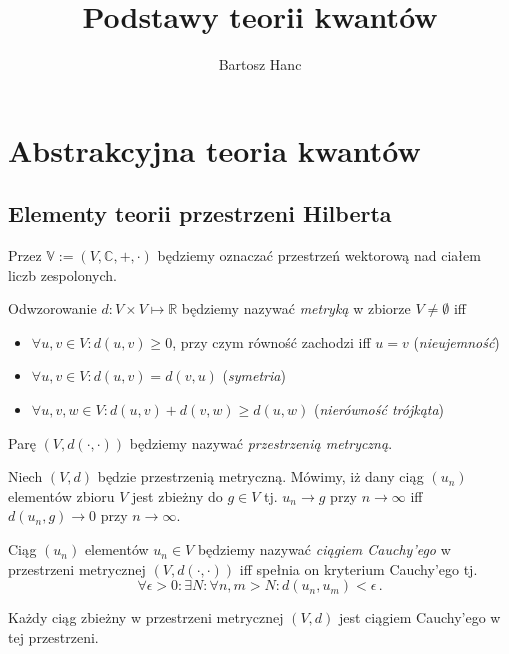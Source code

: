 \documentclass{myclass}
\title{Podstawy teorii kwantów}
\author{Bartosz Hanc}
\begin{document}
\tableofcontents
\section{Abstrakcyjna teoria kwantów}

\subsection{Elementy teorii przestrzeni Hilberta}

Przez \(\mathbb{V} := (V,\mathbb{C},+,\cdot)\) będziemy oznaczać przestrzeń wektorową nad ciałem
liczb zespolonych.

\begin{definition}
Odwzorowanie \(d: V \times V \mapsto \mathbb{R}\) będziemy nazywać \textit{metryką} w zbiorze \(V
\neq \emptyset\) iff
\begin{itemize}

\item \(\forall u,v \in V : d(u,v) \geq 0\), przy czym równość zachodzi iff \(u = v\)
(\textit{nieujemność})

\item \(\forall u,v \in V : d(u,v) = d(v,u)\) (\textit{symetria})

\item \(\forall u,v,w \in V : d(u,v) + d(v,w) \geq d(u,w)\) (\textit{nierówność trójkąta})

\end{itemize}
Parę \((V,d(\cdot,\cdot))\) będziemy nazywać \textit{przestrzenią metryczną}.
\end{definition}

\begin{definition}
Niech \((V,d)\) będzie przestrzenią metryczną. Mówimy, iż dany ciąg \((u_n)\) elementów zbioru \(V\)
jest zbieżny do \(g\in V\) tj. \(u_n \to g\) przy \(n \to \infty\) iff \(d(u_n,g) \to 0\) przy \(n
\to \infty\).   
\end{definition}

\begin{definition}
Ciąg \((u_n)\) elementów \(u_n \in V\) będziemy nazywać \textit{ciągiem Cauchy'ego} w przestrzeni
metrycznej \((V,d(\cdot,\cdot))\) iff spełnia on kryterium Cauchy'ego tj.
\begin{equation*}
    \forall \epsilon > 0 : \exists N : \forall n,m > N : d(u_n,u_m) < \epsilon\,.
\end{equation*}  
\end{definition}

\begin{theorem}
Każdy ciąg zbieżny w przestrzeni metrycznej \((V,d)\) jest ciągiem Cauchy'ego w tej przestrzeni.
\end{theorem}
\end{document}
